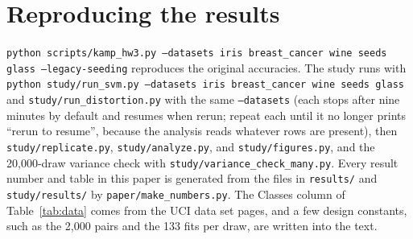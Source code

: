 \section*{Reproducing the results}

\texttt{python scripts/kamp\_hw3.py --datasets iris breast\_cancer wine seeds glass --legacy-seeding} reproduces the original accuracies. The study runs with \texttt{python study/run\_svm.py --datasets iris breast\_cancer wine seeds glass} and \texttt{study/run\_distortion.py} with the same \texttt{--datasets} (each stops after nine minutes by default and resumes when rerun; repeat each until it no longer prints ``rerun to resume'', because the analysis reads whatever rows are present), then \texttt{study/replicate.py}, \texttt{study/analyze.py}, and \texttt{study/figures.py}, and the 20,000-draw variance check with \texttt{study/variance\_check\_many.py}. Every result number and table in this paper is generated from the files in \texttt{results/} and \texttt{study/results/} by \texttt{paper/make\_numbers.py}. The Classes column of Table~\ref{tab:data} comes from the UCI data set pages, and a few design constants, such as the 2,000 pairs and the 133 fits per draw, are written into the text.
